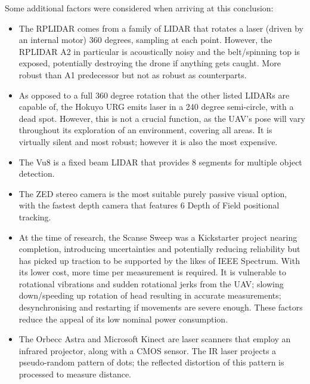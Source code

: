 \documentclass[capstone_report.tex]{subfiles}
\begin{document}
Some additional factors were considered when arriving at this conclusion:
\begin{itemize}
\item The RPLIDAR comes from a family of LIDAR that rotates a laser (driven by an internal motor) 360 degrees, sampling at each point. However, the RPLIDAR A2 in particular is acoustically noisy and the belt/spinning top is exposed, potentially destroying the drone if anything gets caught. More robust than A1 predecessor but not as robust as counterparts.
\item As opposed to a full 360 degree rotation that the other listed LIDARs are capable of, the Hokuyo URG emits laser in a 240 degree semi-circle, with a dead spot. However, this is not a crucial function, as the UAV’s pose will vary throughout its exploration of an environment, covering all areas. It is virtually silent and most robust; however it is also the most expensive.
\item The Vu8 is a fixed beam LIDAR that provides 8 segments for multiple object detection.
\item The ZED stereo camera is the most suitable purely passive visual option, with the fastest depth camera that features 6 Depth of Field positional tracking.
\item At the time of research, the Scanse Sweep was a Kickstarter project nearing completion, introducing uncertainties and potentially reducing reliability but has picked up traction to be supported by the likes of IEEE Spectrum. With its lower cost, more time per measurement is required. It is vulnerable to rotational vibrations and sudden rotational jerks from the UAV; slowing down/speeding up rotation of head resulting in accurate measurements; desynchronising and restarting if movements are severe enough. These factors reduce the appeal of its low nominal power consumption. 
\item The Orbecc Astra and Microsoft Kinect are laser scanners that employ an infrared projector, along with a CMOS sensor. The IR laser projects a pseudo-random pattern of dots; the reflected distortion of this pattern is processed to measure distance.
\end{itemize}
\end{document}
